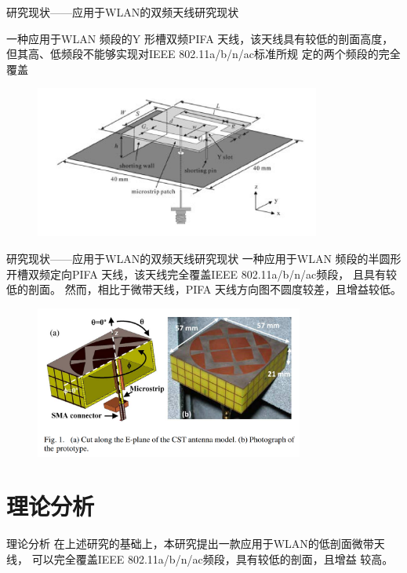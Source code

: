 \documentclass[10pt]{beamer}
\begin{document}
\begin{frame}{研究现状——{\normalsize 应用于WLAN的双频天线研究现状}}

\qquad 一种应用于WLAN
频段的Y 形槽双频PIFA 天线，该天线具有较低的剖面高度，
但其高、低频段不能够实现对IEEE 802.11a/b/n/ac标准所规
定的两个频段的完全覆盖
		\begin{figure}[htbp]
			\centering
			\includegraphics[height=5cm]{figs/30.png}
		\end{figure}
\end{frame}

\begin{frame}{研究现状——{\normalsize 应用于WLAN的双频天线研究现状}}
	\qquad 一种应用于WLAN 频段的半圆形开槽双频定向PIFA
	天线，该天线完全覆盖IEEE 802.11a/b/n/ac频段，
	且具有较低的剖面。 然而，相比于微带天线，PIFA
	天线方向图不圆度较差，且增益较低。		
	\begin{figure}[htbp]
				\centering
				\includegraphics[height=5cm]{figs/29.png}
			\end{figure}
\end{frame}




\section{理论分析}
\begin{frame}{理论分析}
\qquad 在上述研究的基础上，本研究提出一款应用于WLAN的低剖面微带天线，
	可以完全覆盖IEEE 802.11a/b/n/ac频段，具有较低的剖面，且增益
	较高。
\end{frame}
\end{document}
